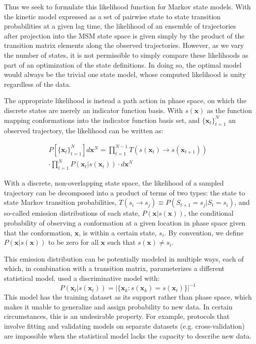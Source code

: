 \documentclass[journal=jpcbfk, layout=twocolumn, manuscript=article]{achemso}
\begin{document}
Thus we seek to formulate this likelihood function for Markov state models. With the kinetic model expressed as a set of pairwise state to state transition probabilities at a given lag time, the likelihood of an ensemble of trajectories after projection into the MSM state space is given simply by the product of the transition matrix elements along the observed trajectories. However, as we vary the number of states, it is not permissible to simply compare these likelihoods as part of an optimization of the state definitions. In doing so, the optimal model would always be the trivial one state model, whose computed likelihood is unity regardless of the data.

The appropriate likelihood is instead a path action in phase space, on which the discrete states are merely an indicator function basis. With $s(\mathbf{x})$ as the function mapping conformations into the indicator function basis set, and $\{\mathbf{x}_t\}_{t=1}^N$ an observed trajectory, the likelihood can be written as:

\begin{equation}
\begin{split}
P\left[\{\mathbf{x}_t\}_{t=1}^N\right] d\mathbf{x}^N = \prod_{t=1}^{N-1} T(s(\mathbf{x}_t) \rightarrow s(\mathbf{x}_{t+1})) \\
\cdot \prod_{t=1}^{N} P(\mathbf{x}_t | s(\mathbf{x}_t)) \cdot d\mathbf{x}^N
\label{eq:like}
\end{split}
\end{equation}

With a discrete, non-overlapping state space, the likelihood of a sampled trajectory can be decomposed into a product of terms of two types: the state to state Markov transition probabilities, $T(s_i \rightarrow s_j) \equiv P(S_{t+1}=s_j | S_{t}=s_i)$, and so-called emission distributions of each state, $P(\mathbf{x} | s(\mathbf{x}))$, the conditional probability of observing a conformation at a given location in phase space given that the conformation, $\mathbf{x}$, is within a certain state, $s_i$. By convention, we define $P(\mathbf{x}| s(\mathbf{x}))$ to be zero for all $\mathbf{x}$ such that $s(\mathbf{x}) \neq s_i$. 

This emission distribution can be potentially modeled in multiple ways, each of which, in combination with a transition matrix, parameterizes a different statistical model. \citet{Kellogg2012Evaluation} used a discriminative model with:
\begin{equation}
P(\mathbf{x}_t | s(\mathbf{x}_t)) = \big| \{ \mathbf{x}_k : s(\mathbf{x}_k) = s(\mathbf{x}_t) \} \big|^{-1}
\end{equation} This model has the training dataset as its support rather than phase space, which makes it unable to generalize and assign probability to new data. In certain circumstances, this is an undesirable property. For example, protocols that involve fitting and validating models on separate datasets (e.g. cross-validation) are impossible when the statistical model lacks the capacity to describe new data.
\end{document}
